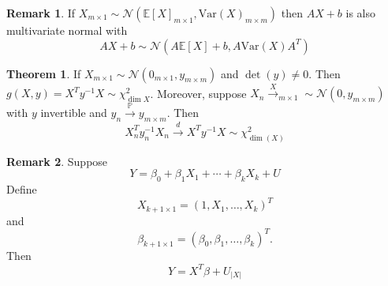 \documentclass[10pt, oneside]{article}
\newcommand{\bbP}{\mathbb{P}}
\newcommand{\Var}{\text{Var}}
\newcommand{\bbE}{\mathbb{E}}
\theoremstyle{definition}
\newtheorem{thm}{Theorem}
\newtheorem{rem}{Remark}
\begin{document}
\begin{rem}
    If $X_{m\times 1} \sim \mathcal{N}(\bbE[X]_{m\times 1}, \Var(X)_{m\times m})$ then $A X + b$ is also multivariate normal with 
    \[AX  + b \sim \mathcal{N}(A \bbE[X] + b, A \Var(X)A^T)\]
\end{rem}



\begin{thm}
    If $X_{m \times 1} \sim \mathcal{N}(0_{m \times 1}, y_{m\times m})$ and $\det(y)\neq 0.$ Then $g(X, y)= X^T y^{-1} X \sim \chi_{\dim X}^2$. Moreover, suppose $X_n \xrightarrow X_{m\times 1} \sim \mathcal{N}(0, y_{m\times m})$ with $y$ invertible and $y_n \xrightarrow{\bbP} y_{m \times m}.$ Then 
    \[X_n^T y_n^{-1}X_n \xrightarrow{d} X^T y^{-1} X \sim \chi^2_{\dim(X)}\]
\end{thm}
\begin{rem}
    Suppose 
    \[Y = \beta_0 + \beta_1 X_1 + \cdots +\beta_kX_k + U\] Define 
    \[X_{k + 1\times 1} = (1, X_1, \dots, X_k)^T\] and 
    \[\beta_{k + 1 \times  1} = (\beta_0, \beta_1, \dots, \beta_k)^T.\] Then 
    \[Y = X^T \beta + U_{|X|}\]
\end{rem}
\end{document}

